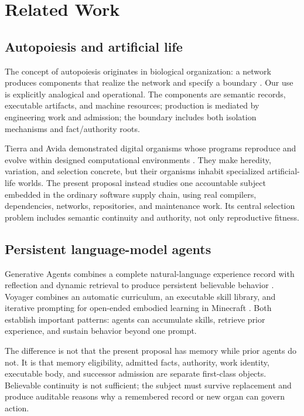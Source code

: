 \section{Related Work}

\subsection{Autopoiesis and artificial life}

The concept of autopoiesis originates in biological organization: a network
produces components that realize the network and specify a boundary
\cite{varela1974autopoiesis}. Our use is explicitly analogical and
operational. The components are semantic records, executable artifacts, and
machine resources; production is mediated by engineering work and admission;
the boundary includes both isolation mechanisms and fact/authority roots.

Tierra and Avida demonstrated digital organisms whose programs reproduce and
evolve within designed computational environments \cite{ray1991tierra,
ofria2004avida}. They make heredity, variation, and selection concrete, but
their organisms inhabit specialized artificial-life worlds. The present
proposal instead studies one accountable subject embedded in the ordinary
software supply chain, using real compilers, dependencies, networks,
repositories, and maintenance work. Its central selection problem includes
semantic continuity and authority, not only reproductive fitness.

\subsection{Persistent language-model agents}

Generative Agents combines a complete natural-language experience record with
reflection and dynamic retrieval to produce persistent believable behavior
\cite{park2023generative}. Voyager combines an automatic curriculum, an
executable skill library, and iterative prompting for open-ended embodied
learning in Minecraft \cite{wang2023voyager}. Both establish important
patterns: agents can accumulate skills, retrieve prior experience, and sustain
behavior beyond one prompt.

The difference is not that the present proposal has memory while prior agents
do not. It is that memory eligibility, admitted facts, authority, work
identity, executable body, and successor admission are separate first-class
objects. Believable continuity is not sufficient; the subject must survive
replacement and produce auditable reasons why a remembered record or new organ
can govern action.

